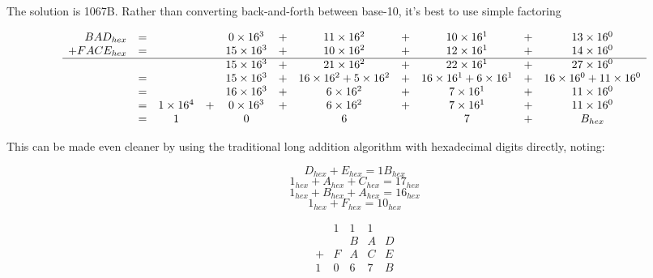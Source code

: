 

The solution is 1067B. Rather than converting back-and-forth between
base-10, it's best to use simple factoring

\begin{center}\small
\[
  \begin{array}{rcccccccccc}
  BAD_{hex} & = &&& 0\times16^3 &+& 11\times16^2 &+& 10\times16^1 &+& 13\times16^0 \\
  +FACE_{hex} & = &&& 15\times16^3 &+& 10\times16^2 &+& 12\times16^1 &+& 14\times16^0 \\\hline
              &   &&& 15\times16^3 &+& 21\times16^2 &+& 22\times16^1 &+& 27\times16^0 \\
              & = &&& 15\times16^3 &+& 16\times16^2+5\times16^2 &+& 16\times16^1+6\times16^1 &+& 16\times16^0+11\times16^0 \\
              & = &&& 16\times16^3 &+& 6\times16^2 &+& 7\times16^1 &+& 11\times16^0 \\
              & = & 1\times16^4 &+& 0\times16^3 &+& 6\times16^2 &+& 7\times16^1 &+& 11\times16^0 \\
              & = & 1 && 0 && 6 && 7 &+& B_{hex} \\
  \end{array}
\]
\end{center}

This can be made even cleaner by using the traditional long addition algorithm
with hexadecimal digits directly, noting:

\[D_{hex}+E_{hex}=1B_{hex}\]
\[1_{hex}+A_{hex}+C_{hex}=17_{hex}\]
\[1_{hex}+B_{hex}+A_{hex}=16_{hex}\]
\[1_{hex}+F_{hex}=10_{hex}\]



\begin{center}\small
\[
  \begin{array}{ccccc}
    & 1 & 1 & 1     \\
    &   & B & A & D \\
  + & F & A & C & E \\\hline
  1 & 0 & 6 & 7 & B
  \end{array}
\]
\end{center}
